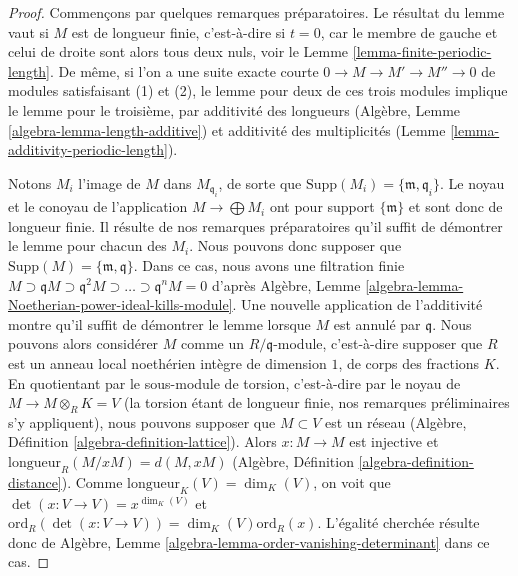 \begin{proof}
Commençons par quelques remarques préparatoires.
Le résultat du lemme vaut si $M$ est de longueur finie, c'est-à-dire si $t = 0$,
car le membre de gauche et celui de droite sont alors tous deux nuls,
voir le Lemme \ref{lemma-finite-periodic-length}.
De même, si l'on a une suite exacte courte $0 \to M \to M' \to M'' \to 0$
de modules satisfaisant (1) et (2), le lemme pour deux de ces trois
modules implique le lemme pour le troisième, par
additivité des longueurs (Algèbre, Lemme \ref{algebra-lemma-length-additive}) et
additivité des multiplicités (Lemme \ref{lemma-additivity-periodic-length}).

\medskip\noindent
Notons $M_i$ l'image de $M$ dans $M_{\mathfrak q_i}$, de sorte que
$\text{Supp}(M_i) = \{\mathfrak m, \mathfrak q_i\}$.
Le noyau et le conoyau de l'application $M \to \bigoplus M_i$
ont pour support $\{\mathfrak m\}$ et sont donc de longueur finie.
Il résulte de nos remarques préparatoires qu'il suffit de
démontrer le lemme pour chacun des $M_i$. Nous pouvons donc supposer que
$\text{Supp}(M) = \{\mathfrak m, \mathfrak q\}$.
Dans ce cas, nous avons une filtration finie
$M \supset \mathfrak qM \supset \mathfrak q^2M \supset \ldots \supset
\mathfrak q^nM = 0$ d'après Algèbre, Lemme
\ref{algebra-lemma-Noetherian-power-ideal-kills-module}.
Une nouvelle application de l'additivité montre qu'il suffit de démontrer le lemme
lorsque $M$ est annulé par $\mathfrak q$.
Nous pouvons alors considérer $M$ comme un $R/\mathfrak q$-module,
c'est-à-dire supposer que $R$ est un anneau local noethérien intègre
de dimension $1$, de corps des fractions $K$.
En quotientant par le sous-module de torsion, c'est-à-dire par le
noyau de $M \to M \otimes_R K = V$ (la torsion étant de
longueur finie, nos remarques préliminaires s'y appliquent),
nous pouvons supposer que $M \subset V$ est un réseau
(Algèbre, Définition \ref{algebra-definition-lattice}).
Alors $x : M \to M$ est injective et
$\text{longueur}_R(M/xM) = d(M, xM)$
(Algèbre, Définition \ref{algebra-definition-distance}). Comme
$\text{longueur}_K(V) = \dim_K(V)$,
on voit que $\det(x : V \to V) = x^{\dim_K(V)}$ et
$\text{ord}_R(\det(x : V \to V)) = \dim_K(V) \text{ord}_R(x)$.
L'égalité cherchée résulte donc de
Algèbre, Lemme \ref{algebra-lemma-order-vanishing-determinant}
dans ce cas.
\end{proof}

